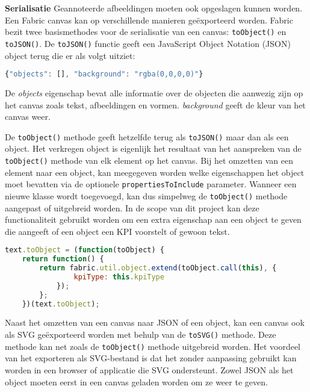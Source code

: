 \textbf{Serialisatie} \cite{FabricJSIntro3Serialization} \break 
Geannoteerde afbeeldingen moeten ook opgeslagen kunnen worden. Een Fabric canvas kan op verschillende manieren ge\"{e}xporteerd worden. Fabric bezit twee basismethodes voor de serialisatie van een canvas: \lstinline{toObject()} en \lstinline{toJSON()}. De \lstinline{toJSON()} functie geeft een JavaScript Object Notation (JSON) object terug die er als volgt uitziet:

\begin{lstlisting}[language=javascript]
 {"objects": [], "background": "rgba(0,0,0,0)"}
\end{lstlisting} 

De \textit{objects} eigenschap bevat alle informatie over de objecten die aanwezig zijn op het canvas zoals tekst, afbeeldingen en vormen. \textit{background} geeft de kleur van het canvas weer. 


De \lstinline{toObject()} methode geeft hetzelfde terug als \lstinline{toJSON()} maar dan als een object. Het verkregen object is eigenlijk het resultaat van het aanspreken van de \lstinline{toObject()} methode van elk element op het canvas. Bij het omzetten van een element naar een object, kan meegegeven worden welke eigenschappen het object moet bevatten via de optionele \lstinline{propertiesToInclude} parameter. Wanneer een nieuwe klasse wordt toegevoegd, kan dus simpelweg de \lstinline{toObject()} methode aangepast of uitgebreid worden. In de scope van dit project kan deze functionaliteit gebruikt worden om een extra eigenschap aan een object te geven die aangeeft of een object een KPI voorstelt of gewoon tekst.  

\begin{lstlisting}[language=javascript]
	text.toObject = (function(toObject) {   
	return function() {     
		return fabric.util.object.extend(toObject.call(this), {       
				kpiType: this.kpiType     
			});   
		}; 
	})(text.toObject);
\end{lstlisting}

Naast het omzetten van een canvas naar JSON of een object, kan een canvas ook als SVG ge\"{e}xporteerd worden met behulp van de \lstinline{toSVG()} methode. Deze methode kan net zoals de \lstinline{toObject()} methode uitgebreid worden. Het voordeel van het exporteren als SVG-bestand is dat het zonder aanpassing gebruikt kan worden in een browser of applicatie die SVG ondersteunt. Zowel JSON als het object moeten eerst in een canvas geladen worden om ze weer te geven. 

